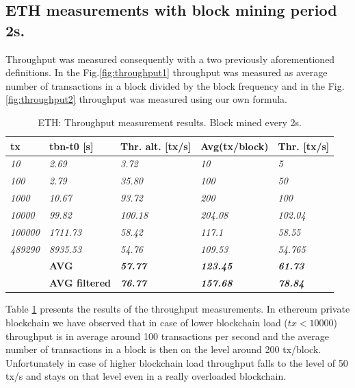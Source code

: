 \documentclass[12pt]{article}
\begin{document}
\subsection{ETH measurements with block mining period 2s.}
Throughput was measured consequently with a two previously aforementioned definitions. In the Fig.\ref{fig:throughput1} throughput was measured as average number of transactions in a block divided by the block frequency and in the Fig.\ref{fig:throughput2} throughput was measured using our own formula. 

\begin{table}[h]
\begin{tabular}{l|l|l|l|l|}
\hline
\multicolumn{1}{|l|}{\textbf{tx}} & \textbf{tbn-t0 {[}s{]}} & \textbf{Thr. alt. {[}tx/s{]}} & \textbf{Avg(tx/block)} & \textbf{Thr. {[}tx/s{]}} \\ \hline
\multicolumn{1}{|l|}{\textit{10}} & \textit{2.69} & \textit{3.72} & \textit{10} & \textit{5} \\ \hline
\multicolumn{1}{|l|}{\textit{100}} & \textit{2.79} & \textit{35.80} & \textit{100} & \textit{50} \\ \hline
\multicolumn{1}{|l|}{\textit{1000}} & \textit{10.67} & \textit{93.72} & \textit{200} & \textit{100} \\ \hline
\multicolumn{1}{|l|}{\textit{10000}} & \textit{99.82} & \textit{100.18} & \textit{204.08} & \textit{102.04} \\ \hline
\multicolumn{1}{|l|}{\textit{100000}} & \textit{1711.73} & \textit{58.42} & \textit{117.1} & \textit{58.55} \\ \hline
\multicolumn{1}{|l|}{\textit{489290}} & \textit{8935.53} & \textit{54.76} & \textit{109.53} & \textit{54.765} \\ \hline
 & \textbf{AVG} & \textit{\textbf{57.77}} & \textit{\textbf{123.45}} & \textit{\textbf{61.73}} \\ \cline{2-5} 
 & \textbf{AVG filtered} & \textit{\textbf{76.77}} & \textit{\textbf{157.68}} & \textit{\textbf{78.84}} \\ \cline{2-5} 
\end{tabular}
\caption{ETH: Throughput measurement results. Block mined every 2s.}
\label{table:2}
\end{table}

Table \ref{table:2} presents the results of the throughput measurements. In ethereum private blockchain we have observed that in case of lower blockchain load ($tx < 10000$) throughput is in average around 100 transactions per second and the average number of transactions in a block is then on the level around 200 tx/block. Unfortunately in case of higher blockchain load  throughput falls to the level of 50 tx/s and stays on that level even in a really overloaded blockchain. 
\end{document}
